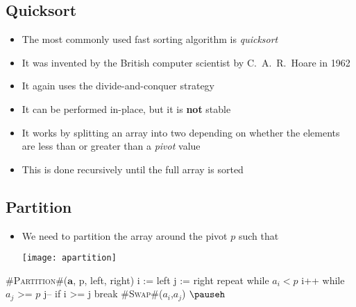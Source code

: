 \Outline %

\begin{slide}
\section{Quicksort}

\begin{PauseHighLight}
  \begin{itemize}
  \item The most commonly used fast sorting algorithm is
    \emph{quicksort}\pause 
  \item It was invented by the British computer scientist  by
    C.~A.~R.~Hoare in 1962\pause
  \item It again uses the divide-and-conquer strategy\pause
  \item It can be performed in-place, but it is \textbf{not}
    stable\pause
  \item It works by splitting an array into two depending on whether the
    elements are less than or greater than a \emph{pivot} value\pause
  \item This is done recursively until the full array is sorted\pause
  \end{itemize}
\end{PauseHighLight}

\end{slide}


\begin{slide}
\section[-1]{Partition}

\pausebuild
\begin{itemize}
\item We need to partition the array around the pivot $p$ such that
  \begin{center}
    \texttt{[image: apartition]}\pauseh
  \end{center}
\end{itemize}
\begin{minipage}{6cm}
\begin{pseudo}
#\textsc{Partition}#($\bm{a}$, p, left, right)
{
  i := left
  j := right
  repeat {
    while $a_i < p$
       i++
    while $a_j$ >= $p$
       j--
    if i >= j
       break
    #\textsc{Swap}#($a_i$,$a_j$)
  }
}$\pauseh$
\end{pseudo}
\end{minipage}\hfill
\begin{minipage}{16cm}
\vfill
\begin{center}
  \pause
\end{center}
\vfill
\end{minipage}
\end{slide}


